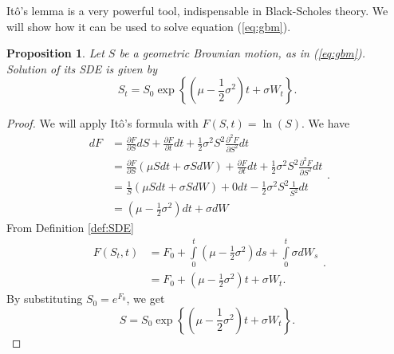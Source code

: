 \documentclass[a4paper,11pt, twoside]{book}
\newtheorem{prop}[thm]{Proposition}
\theoremstyle{definition}
\theoremstyle{remark}
\begin{document}
It\^{o}'s lemma is a very powerful tool, indispensable in Black-Scholes theory. We will show how it can be used to solve equation (\ref{eq:gbm}).
\begin{prop}
\label{prop:solution_dynamics}
 Let $S$ be a geometric Brownian motion, as in (\ref{eq:gbm}).
 Solution of its SDE is given by
 \begin{equation}
  \label{eq:gmb_sol}
  S_t = S_0 \exp\left\{ (\mu - \frac{1}{2}\sigma^2)t + \sigma W_t \right\}.
 \end{equation}
\end{prop}
\begin{proof}
We will apply It\^{o}'s formula with $F(S,t) = \ln(S)$. We have
 \begin{equation*}
  \begin{split}
   dF &= \frac{\partial F}{\partial S}dS + \frac{\partial F}{\partial t}dt + \frac{1}{2}\sigma^2 S^2 \frac{\partial^2 F}{\partial S^2}dt \\
   &= \frac{\partial F}{\partial S}(\mu S dt + \sigma S dW) + \frac{\partial F}{\partial t}dt + \frac{1}{2}\sigma^2 S^2 \frac{\partial^2 F}{\partial S^2}dt \\    
   &= \frac{1}{S}(\mu S dt + \sigma S dW) + 0dt - \frac{1}{2}\sigma^2 S^2 \frac{1}{S^2}dt \\   
   &= (\mu - \frac{1}{2}\sigma^2) dt + \sigma dW
  \end{split}.
 \end{equation*}
 From Definition \ref{def:SDE}
 \begin{equation*}
  \begin{split}
  F(S_t,t) &= F_0 + \int\limits_0^t (\mu - \frac{1}{2}\sigma^2) ds + \int\limits_0^t \sigma dW_s\\
  &= F_0 + (\mu - \frac{1}{2}\sigma^2)t +  \sigma W_t. 
  \end{split}.
 \end{equation*}
 By substituting $S_0 = e^{F_0}$, we get
 \[ S = S_0 \exp\left\{ (\mu - \frac{1}{2}\sigma^2)t + \sigma W_t \right\}. \] 
\end{proof}
\end{document}
